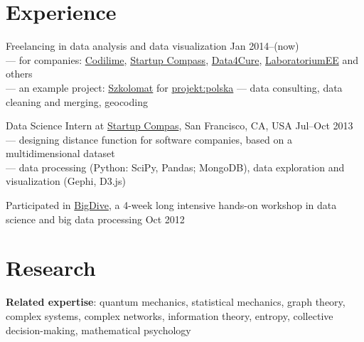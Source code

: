 \documentclass[margin,line]{resume}
\begin{document}
\begin{resume}

    \section{\mysidestyle Experience}

    \begin{list2}

    \item Freelancing in data analysis and data visualization  \hfill Jan 2014--(now)\\
        --- for companies: \href{http://www.codilime.com/}{Codilime}, \href{http://compass.co}{Startup Compass}, \href{http://www.data4cure.com/}{Data4Cure}, \href{https://laboratorium.ee/en}{LaboratoriumEE} and others\\
        --- an example project: \href{http://szkolomat.pl/}{Szkolomat} for \href{http://projektpolska.pl/english/}{projekt:polska} --- data consulting, data cleaning and merging, geocoding

    \item Data Science Intern at \href{http://compass.co}{Startup Compas}, San Francisco, CA, USA \hfill Jul--Oct 2013\\
        --- designing distance function for software companies, based on a multidimensional dataset\\
        --- data processing (Python: SciPy, Pandas; MongoDB), data exploration and visualization (Gephi, D3.js)

    \item Participated in \href{http://bigdive.eu}{BigDive}, a 4-week long intensive hands-on workshop in data science and big data processing \hfill { Oct 2012}

    \end{list2}

    \section{\mysidestyle Research}

    \begin{list2}

    \item {\bf Related expertise}: quantum mechanics, statistical mechanics, graph theory, complex systems, complex networks, information theory, entropy, collective decision-making, mathematical psychology


\end{list2}
\end{resume}
\end{document}
